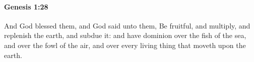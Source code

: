 
		\paragraph{Genesis 1:28} %
			\label{GENESIS-1-28}

			And God blessed them, and God said unto them, Be fruitful, and multiply, and replenish the earth, and subdue it: and have dominion over the fish of the sea, and over the fowl of the air, and over every living thing that moveth upon the earth.


